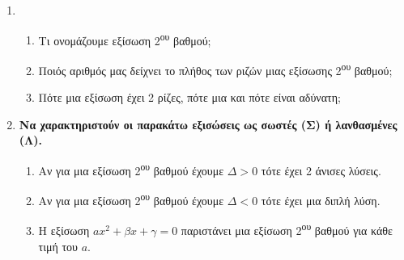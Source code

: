 \documentclass[twoside]{article}
\newcommand{\tssL}[1]{\MakeLowercase{\textsuperscript{#1}}}
\begin{document}
\begin{enumerate}
\item
\begin{enumerate}[label=\roman*.]
\item Τι ονομάζουμε εξίσωση 2\textsuperscript{ου} βαθμού;
\item Ποιός αριθμός μας δείχνει το πλήθος των ριζών μιας εξίσωσης 2\textsuperscript{ου} βαθμού;
\item Πότε μια εξίσωση έχει 2 ρίζες, πότε μια και πότε είναι αδύνατη;
\end{enumerate}
\item \textbf{Να χαρακτηριστούν οι παρακάτω εξισώσεις ως σωστές (Σ) ή λανθασμένες (Λ).}
\begin{enumerate}[label=\roman*.]
\item Αν για μια εξίσωση 2\textsuperscript{ου} βαθμού έχουμε $ \varDelta>0 $ τότε έχει 2 άνισες λύσεις.
\item Αν για μια εξίσωση 2\textsuperscript{ου} βαθμού έχουμε $ \varDelta<0 $ τότε έχει μια διπλή λύση.
\item Η εξίσωση $ ax^2+\beta x+\gamma=0 $ παριστάνει μια εξίσωση 2\textsuperscript{ου} βαθμού για κάθε τιμή του $ a $.
\end{enumerate}
\end{enumerate}
\newpage
\end{document}
